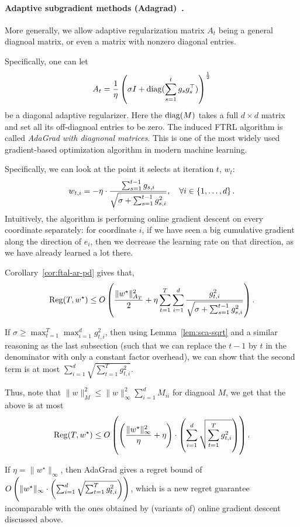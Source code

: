 \documentclass{article}
\DeclareMathOperator*{\diag}{{\rm diag}}
\DeclareMathOperator*{\Reg}{{\rm Reg}}
\begin{document}
\paragraph{Adaptive subgradient methods (Adagrad)~\cite{mcmahan2010adaptive, duchi2011adaptive}.} More generally, we allow adaptive regularization matrix $A_t$ being a general diagnoal matrix, or even a matrix with nonzero diagonal entries.

Specifically, one can let
\[ A_t = \frac1\eta \del{\sigma I + \diag( \sum_{s=1}^t g_s g_s^\top) }^\frac12\] be a diagonal adaptive regularizer. Here the $\diag(M)$ takes a full $d \times d$ matrix and set all its off-diagnoal entries to be zero.
The induced FTRL algorithm is called {\em AdaGrad with diagnonal matrices}. This is one of the most widely used gradient-based optimization algorithm in modern machine learning.

Specifically, we can look at the point it selects at iteration $t$, $w_t$:
\[ w_{t,i} = -\eta \cdot \frac{\sum_{s=1}^{t-1} g_{s,i}}{\sqrt{\sigma + \sum_{s=1}^{t-1} g_{s,i}^2}}, \quad \forall i \in \cbr{1,\ldots,d}. \]
Intuitively, the algorithm is performing online gradient descent on every coordinate separately: for coordinate $i$, if we have seen a big cumulative gradient along the direction of $e_i$, then we decrease the learning rate on that direction, as we have already learned a lot there.

Corollary~\ref{cor:ftal-ar-pd} gives that,
\[ \Reg(T, w^\star) \leq O\del{ \frac{\| w^\star \|_{A_T}^2}{2} + \eta \sum_{t=1}^T \sum_{i=1}^d \frac{g_{t,i}^2}{\sqrt{\sigma + \sum_{s=1}^{t-1} g_{s,i}^2}}}. \]

If $\sigma \geq \max_{t=1}^T \max_{i=1}^d g_{t,i}^2$, then using Lemma~\ref{lem:sca-sqrt} and a similar reasoning as the last subsection (such that we can replace the $t-1$ by $t$ in the denominator with only a constant factor overhead), we can show that the second term is at most $\sum_{i=1}^d \sqrt{\sum_{t=1}^T g_{t,i}^2}$.

Thus, note that $\| w \|_M^2 \leq \| w \|_\infty^2 \sum_{i=1}^d M_{ii}$ for diagnoal $M$, we get that the above is at most
\[ \Reg(T, w^\star) \leq O\del{ \del{\frac{\| w^\star \|_\infty^2}{\eta} + \eta} \cdot \del{\sum_{i=1}^d \sqrt{\sum_{t=1}^T g_{t,i}^2}} }. \]

If $\eta = \| w^\star \|_\infty$, then AdaGrad gives a regret bound of $O\del{ \| w^\star \|_\infty \cdot \del{\sum_{i=1}^d \sqrt{\sum_{t=1}^T g_{t,i}^2}} }$, which is a new regret guarantee incomparable with the ones obtained by (variants of) online gradient descent discussed above.
\end{document}
